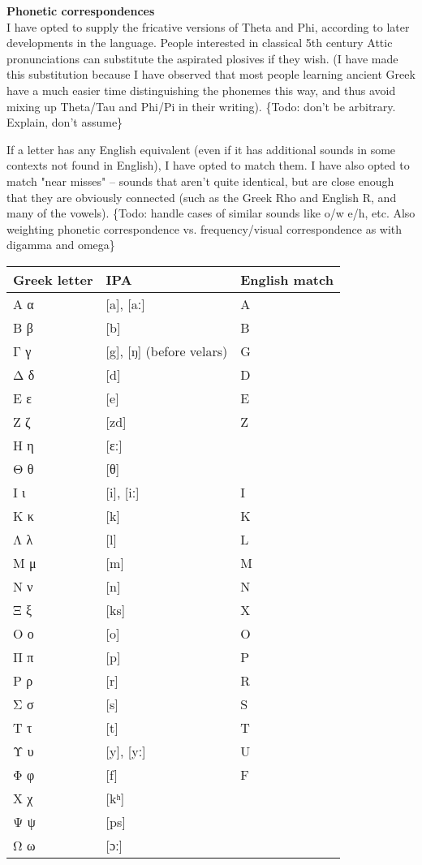 \documentclass[11pt]{article}
\begin{document}
\noindent \textbf{Phonetic correspondences} \\

I have opted to supply the fricative versions of Theta and Phi, according to later developments in the language. People interested in classical 5th century Attic pronunciations can substitute the aspirated plosives if they wish. (I have made this substitution because I have observed that most people learning ancient Greek have a much easier time distinguishing the phonemes this way, and thus avoid mixing up Theta/Tau and Phi/Pi in their writing). \{Todo: don't be arbitrary. Explain, don't assume\}

If a letter has any English equivalent (even if it has additional sounds in some contexts not found in English), I have opted to match them. I have also opted to match "near misses" -- sounds that aren't quite identical, but are close enough that they are obviously connected (such as the Greek Rho and English R, and many of the vowels). \{Todo: handle cases of similar sounds like o/w e/h, etc. Also weighting phonetic correspondence vs. frequency/visual correspondence as with digamma and omega\}

\begin{center}
\begin{tabular}{lll}
Greek letter & IPA & English match\\
\hline
Α α & [a], [aː] & A\\
Β β & [b] & B\\
Γ γ & [g], [ŋ] (before velars) & G\\
Δ δ & [d] & D\\
Ε ε & [e] & E\\
Ζ ζ & [zd] & Z\\
Η η & [ɛː] & \\
Θ θ & [θ] & \\
Ι ι & [i], [iː] & I\\
Κ κ & [k] & K\\
Λ λ & [l] & L\\
Μ μ & [m] & M\\
Ν ν & [n] & N\\
Ξ ξ & [ks] & X\\
Ο ο & [o] & O\\
Π π & [p] & P\\
Ρ ρ & [r] & R\\
Σ σ & [s] & S\\
Τ τ & [t] & T\\
Υ υ & [y], [yː] & U\\
Φ φ & [f] & F\\
Χ χ & [kʰ] & \\
Ψ ψ & [ps] & \\
Ω ω & [ɔː] & \\
\end{tabular}
\end{center}
\end{document}
